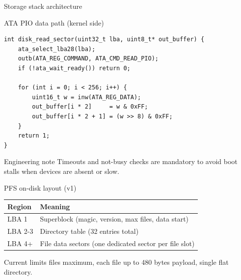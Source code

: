 \documentclass[aspectratio=169]{beamer}
\newcommand{\concept}[2]{%
  \begin{block}{#1}\smallskip #2\smallskip\end{block}\vspace{5pt}}
\begin{document}
\begin{frame}{Storage stack architecture}
\begin{center}
\end{center}
\end{frame}

\begin{frame}[fragile]{ATA PIO data path (kernel side)}
\begin{lstlisting}[style=clang]
int disk_read_sector(uint32_t lba, uint8_t* out_buffer) {
    ata_select_lba28(lba);
    outb(ATA_REG_COMMAND, ATA_CMD_READ_PIO);
    if (!ata_wait_ready()) return 0;

    for (int i = 0; i < 256; i++) {
        uint16_t w = inw(ATA_REG_DATA);
        out_buffer[i * 2]     = w & 0xFF;
        out_buffer[i * 2 + 1] = (w >> 8) & 0xFF;
    }
    return 1;
}
\end{lstlisting}
\concept{Engineering note}{
  Timeouts and not-busy checks are mandatory to avoid boot stalls when devices are absent or slow.
}
\end{frame}

\begin{frame}{PFS on-disk layout (v1)}
  \small
  \begin{tabular}{@{}p{3.4cm}p{8.6cm}@{}}
    \toprule
    \textbf{Region} & \textbf{Meaning} \\
    \midrule
    LBA 1 & Superblock (magic, version, max files, data start) \\
    LBA 2-3 & Directory table (32 entries total) \\
    LBA 4+ & File data sectors (one dedicated sector per file slot) \\
    \bottomrule
  \end{tabular}
  \vspace{6pt}
  \concept{Current limits}{
    32 files maximum, each file up to 480 bytes payload, single flat directory.
  }
\end{frame}
\end{document}

